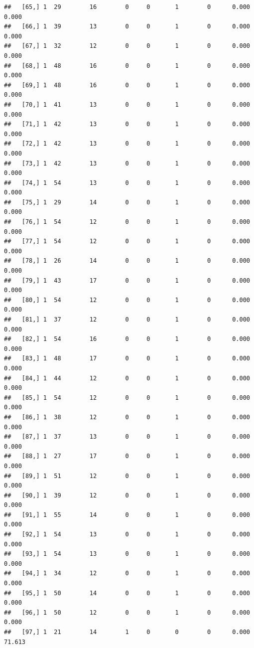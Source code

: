 \documentclass[
]{article}
\begin{document}
\begin{verbatim}
##   [65,] 1  29        16        0     0       1        0      0.000      0.000
##   [66,] 1  39        13        0     0       1        0      0.000      0.000
##   [67,] 1  32        12        0     0       1        0      0.000      0.000
##   [68,] 1  48        16        0     0       1        0      0.000      0.000
##   [69,] 1  48        16        0     0       1        0      0.000      0.000
##   [70,] 1  41        13        0     0       1        0      0.000      0.000
##   [71,] 1  42        13        0     0       1        0      0.000      0.000
##   [72,] 1  42        13        0     0       1        0      0.000      0.000
##   [73,] 1  42        13        0     0       1        0      0.000      0.000
##   [74,] 1  54        13        0     0       1        0      0.000      0.000
##   [75,] 1  29        14        0     0       1        0      0.000      0.000
##   [76,] 1  54        12        0     0       1        0      0.000      0.000
##   [77,] 1  54        12        0     0       1        0      0.000      0.000
##   [78,] 1  26        14        0     0       1        0      0.000      0.000
##   [79,] 1  43        17        0     0       1        0      0.000      0.000
##   [80,] 1  54        12        0     0       1        0      0.000      0.000
##   [81,] 1  37        12        0     0       1        0      0.000      0.000
##   [82,] 1  54        16        0     0       1        0      0.000      0.000
##   [83,] 1  48        17        0     0       1        0      0.000      0.000
##   [84,] 1  44        12        0     0       1        0      0.000      0.000
##   [85,] 1  54        12        0     0       1        0      0.000      0.000
##   [86,] 1  38        12        0     0       1        0      0.000      0.000
##   [87,] 1  37        13        0     0       1        0      0.000      0.000
##   [88,] 1  27        17        0     0       1        0      0.000      0.000
##   [89,] 1  51        12        0     0       1        0      0.000      0.000
##   [90,] 1  39        12        0     0       1        0      0.000      0.000
##   [91,] 1  55        14        0     0       1        0      0.000      0.000
##   [92,] 1  54        13        0     0       1        0      0.000      0.000
##   [93,] 1  54        13        0     0       1        0      0.000      0.000
##   [94,] 1  34        12        0     0       1        0      0.000      0.000
##   [95,] 1  50        14        0     0       1        0      0.000      0.000
##   [96,] 1  50        12        0     0       1        0      0.000      0.000
##   [97,] 1  21        14        1     0       0        0      0.000     71.613

\end{verbatim}
\end{document}
